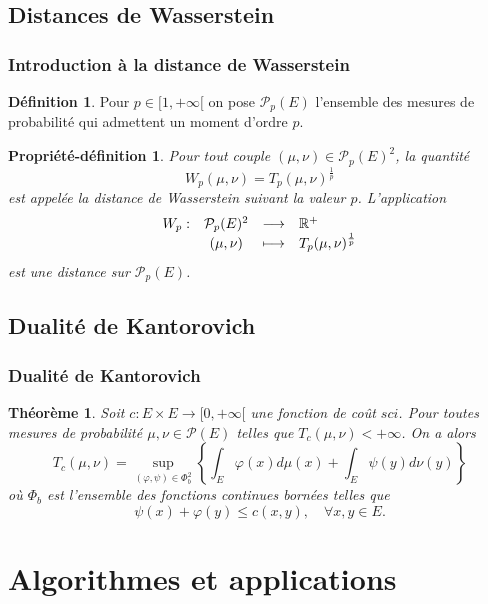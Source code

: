 \documentclass{beamer}
\newtheorem{thm}{Théorème}
\newtheorem{prop-def}{Propriété-définition}
\theoremstyle{definition}
\newtheorem{defi}{Définition}
\begin{document}
\subsection{Distances de Wasserstein}
\begin{frame}
	\frametitle{Introduction à la distance de Wasserstein}
	\begin{defi}
		Pour  $p \in [1, +\infty[$ on pose $\mathcal P_p(E )$ l'ensemble des mesures de probabilité qui admettent un moment d'ordre $p$.
		
	\end{defi}
	\begin{prop-def}
		Pour tout couple $(\mu,\nu)\in \mathcal P_p(E )^2$, la quantité 
		$$W_p(\mu,\nu) = T_p (\mu, \nu)^{\frac{1}{p}} $$
		\noindent est appelée la distance de Wasserstein suivant la valeur $p$. L'application $$\begin{array}{cccl}W_p :& \mathcal P_p(E )^2&  \longrightarrow& \mathbb{R}^+\\
		&(\mu,\nu)&\longmapsto&T_p (\mu, \nu)^{\frac{1}{p}}
		\end{array}$$ 
		\noindent est une distance sur $\mathcal P_p(E )$.
	\end{prop-def}
\end{frame}

\subsection{Dualité de Kantorovich}
\begin{frame}
	\frametitle{Dualité de Kantorovich}
	\begin{thm}
		Soit $c : E \times E \to [0, +\infty[$ une fonction de coût $sci$. Pour toutes mesures de probabilité $\mu, \nu \in \mathcal P(E )$ telles que $T_c (\mu, \nu) < +\infty$. On a alors
		$$T_c (\mu, \nu) = \sup\limits_{(\varphi,\psi)\in \Phi_b^2}\left\{\int_{E}\varphi(x)d\mu(x) + \int_{E}\psi(y)d\nu(y)\right\} $$
		\noindent où $\Phi_b$ est l'ensemble des fonctions continues bornées telles que
		$$\psi(x) + \varphi(y) \leq c(x, y), \quad \forall x, y \in E.$$
	\end{thm} 
\end{frame}


\section{Algorithmes et applications}
\end{document}
